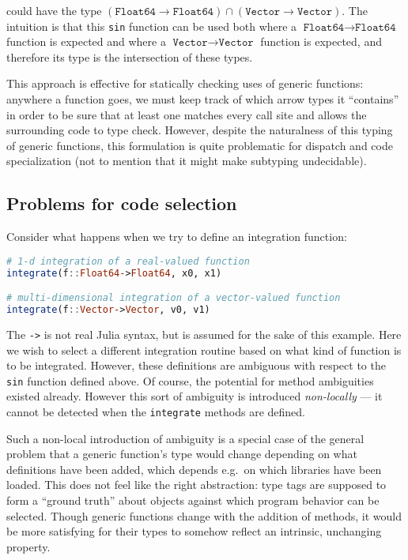 \noindent
could have the type $(\texttt{Float64}\rightarrow\texttt{Float64})\cap(\texttt{Vector}\rightarrow\texttt{Vector})$.
The intuition is that this \texttt{sin} function can be
used both where a $\texttt{Float64}\rightarrow\texttt{Float64}$ function
is expected and where a $\texttt{Vector}\rightarrow\texttt{Vector}$ function is expected,
and therefore its type is the intersection of these types.

This approach is effective for statically checking uses of generic
functions: anywhere a function goes, we must keep track of which arrow
types it ``contains'' in order to be sure that at least one matches
every call site and allows the surrounding code to type check.
However, despite the naturalness of this typing of generic functions,
this formulation is quite problematic for dispatch and code specialization
(not to mention that it might make subtyping undecidable).

\subsection{Problems for code selection}

Consider what happens when we try to define an integration function:

\begin{singlespace}
\begin{lstlisting}[language=julia]
# 1-d integration of a real-valued function
integrate(f::Float64->Float64, x0, x1)

# multi-dimensional integration of a vector-valued function
integrate(f::Vector->Vector, v0, v1)
\end{lstlisting}
\end{singlespace}

\noindent
The \texttt{->} is not real Julia syntax, but is assumed for the sake of
this example.
Here we wish to select a different integration routine based on what
kind of function is to be integrated.
However, these definitions are ambiguous with respect to the \texttt{sin}
function defined above.
Of course, the potential for method ambiguities existed already.
However this sort of ambiguity is introduced \emph{non-locally} ---
it cannot be detected when the \texttt{integrate} methods are defined.


Such a non-local introduction of ambiguity is a special case of the
general problem that a generic function's type would change depending
on what definitions have been added, which depends e.g.\ on which libraries
have been loaded.
This does not feel like the right abstraction:
type tags are supposed to form a ``ground truth'' about objects against
which program behavior can be selected.
Though generic functions change with the addition of methods, it would be more
satisfying for their types to somehow reflect an intrinsic, unchanging
property.

